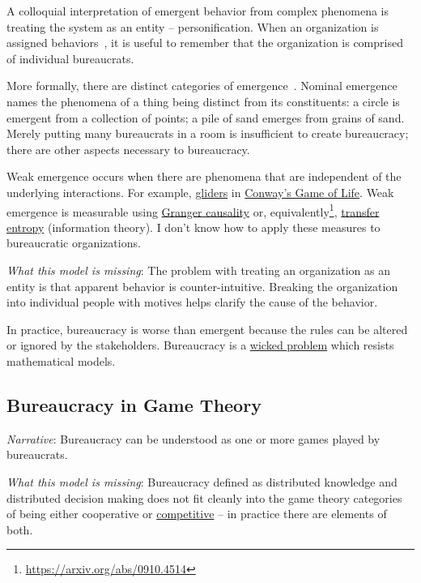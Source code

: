 A colloquial interpretation of emergent behavior from complex phenomena is treating the system as an entity -- personification.
When an organization is assigned behaviors~\cite{2002_Gall}, it is useful to remember that the organization is comprised of individual bureaucrats. 


More formally, there are distinct categories of emergence~\cite{2002_Bedau}. Nominal emergence names the phenomena of a thing being distinct from its constituents: a circle is emergent from a collection of points; a pile of sand emerges from grains of sand. Merely putting many bureaucrats in a room is insufficient to create bureaucracy; there are other aspects necessary to bureaucracy. 

Weak emergence occurs when there are phenomena that are independent of the underlying interactions. For example, \href{https://en.wikipedia.org/wiki/Glider_(Conway\%27s_Life)}{gliders} in \href{https://en.wikipedia.org/wiki/Conway\%27s_Game_of_Life}{Conway's Game of Life}.
Weak emergence is measurable using \href{https://en.wikipedia.org/wiki/Granger_causality}{Granger causality} or, equivalently\footnote{\href{https://arxiv.org/abs/0910.4514}{https://arxiv.org/abs/0910.4514}}, \href{https://en.wikipedia.org/wiki/Transfer_entropy}{transfer entropy} (information theory). I don't know how to apply these measures to bureaucratic organizations. 

\textit{What this model is missing}: The problem with treating an organization as an entity is that apparent behavior is counter-intuitive. Breaking the organization into individual people with motives helps clarify the cause of the behavior. 

In practice, bureaucracy is worse than emergent because the rules can be altered or ignored by the stakeholders. Bureaucracy is a \href{https://en.wikipedia.org/wiki/Wicked_problem}{wicked problem} which resists mathematical models. 

\subsection*{Bureaucracy in Game Theory}
\textit{Narrative}: Bureaucracy can be understood as one or more games played by bureaucrats. 

\textit{What this model is missing}: Bureaucracy defined as distributed knowledge and distributed decision making does not fit cleanly into the game theory categories of being either cooperative or \href{https://en.wikipedia.org/wiki/Non-cooperative_game_theory}{competitive} -- in practice there are elements of both. 

